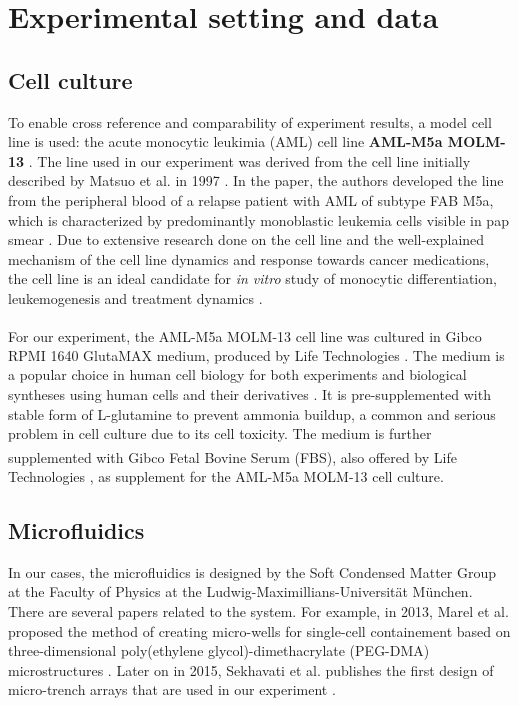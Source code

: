 \documentclass[pdftex,12pt,a4paper]{report}
\begin{document}
\section{Experimental setting and data}

\subsection{Cell culture}
\label{subsection:cell_culture}

To enable cross reference and comparability of experiment results, a model cell line is used: the acute monocytic leukimia (AML) cell line \textbf{AML-M5a MOLM-13} \cite{matsuo1997two}. The line used in our experiment was derived from the cell line initially described by Matsuo et al. in 1997 \cite{matsuo1997two}. In the paper, the authors developed the line from the peripheral blood of a relapse patient with AML of subtype FAB M5a, which is characterized by predominantly monoblastic leukemia cells visible in pap smear \cite{arber20162016}. Due to extensive research done on the cell line and the well-explained mechanism of the cell line dynamics and response towards cancer medications, the cell line is an ideal candidate for \textit{in vitro} study of monocytic differentiation, leukemogenesis and treatment dynamics \cite{matsuo1997two, kelly2002ct53518, yokota1997internal}.

For our experiment, the AML-M5a MOLM-13 cell line was cultured in Gibco\textsuperscript{\textregistered} RPMI 1640 GlutaMAX medium, produced by Life Technologies \cite{gibcocellculture2017}. The medium is a popular choice in human cell biology for both experiments and biological syntheses using human cells and their derivatives \cite{blight2000efficient, shimizu2002fabrication}. It is pre-supplemented with stable form of L-glutamine to prevent ammonia buildup, a common and serious problem in cell culture due to its cell toxicity\cite{satter1974effect}. The medium is further supplemented with Gibco\textsuperscript{\textregistered} Fetal Bovine Serum (FBS), also offered by Life Technologies \cite{gibcofbs2017}, as supplement for the AML-M5a MOLM-13 cell culture.


\subsection{Microfluidics}
\label{subsection:microfluid_env}

In our cases, the microfluidics is designed by the Soft Condensed Matter Group at the  Faculty of Physics at the Ludwig-Maximillians-Universit\"at M\"unchen. There are several papers related to the system. For example, in 2013, Marel et al. proposed the method of creating micro-wells for single-cell containement based on three-dimensional poly(ethylene glycol)-dimethacrylate (PEG-DMA) microstructures \cite{marel2013arraying}. Later on in 2015, Sekhavati et al. publishes the first design of micro-trench arrays that are used in our experiment \cite{sekhavati2015marker, sekhavati2015dynamic}.
\end{document}
